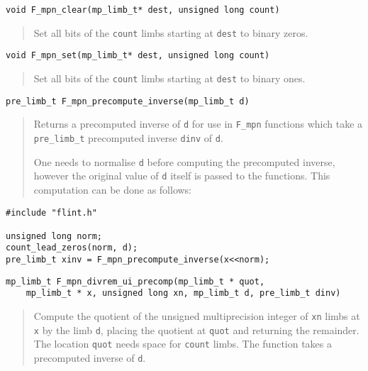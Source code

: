 \documentclass[a4paper,10pt]{article}
\newcommand{\code}{\lstinline}
\begin{document}
\begin{lstlisting}
void F_mpn_clear(mp_limb_t* dest, unsigned long count)
\end{lstlisting}
\begin{quote}
Set all bits of the \code{count} limbs starting at \code{dest} to binary zeros.
\end{quote}

\begin{lstlisting}
void F_mpn_set(mp_limb_t* dest, unsigned long count)
\end{lstlisting}
\begin{quote}
Set all bits of the \code{count} limbs starting at \code{dest} to binary ones.
\end{quote}

\begin{lstlisting}
pre_limb_t F_mpn_precompute_inverse(mp_limb_t d)                  
\end{lstlisting}
\begin{quote}
Returns a precomputed inverse of \code{d} for use in \code{F_mpn} functions which take a \code{pre_limb_t} precomputed inverse \code{dinv} of \code{d}. 

One needs to normalise \code{d} before computing the precomputed inverse, however the original value of \code{d} itself is passed to the functions. This computation can be done as follows:
\end{quote}

\begin{lstlisting}
#include "flint.h"

unsigned long norm;
count_lead_zeros(norm, d);
pre_limb_t xinv = F_mpn_precompute_inverse(x<<norm);
\end{lstlisting}

\begin{lstlisting}
mp_limb_t F_mpn_divrem_ui_precomp(mp_limb_t * quot, 
    mp_limb_t * x, unsigned long xn, mp_limb_t d, pre_limb_t dinv)
\end{lstlisting}
\begin{quote}
Compute the quotient of the unsigned multiprecision integer of \code{xn} limbs at \code{x} by the limb \code{d}, placing the quotient at \code{quot} and returning the remainder. The location \code{quot} needs space for \code{count} limbs. The function takes a precomputed inverse of \code{d}.
\end{quote}
             
\end{document}
